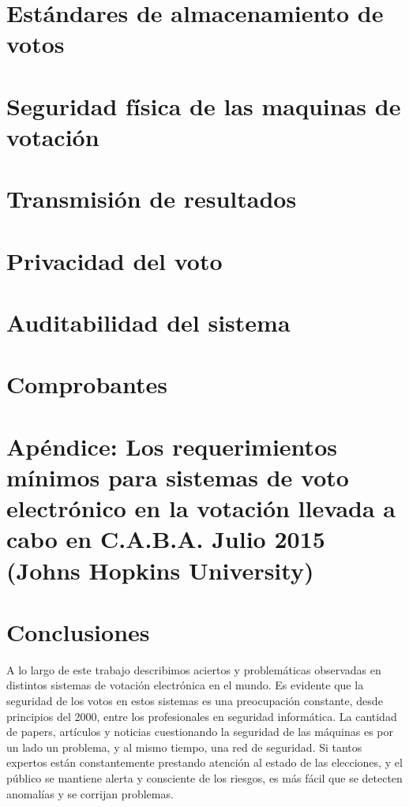 \documentclass[11pt]{article}
\begin{document}
\pagebreak
\section{Estándares de almacenamiento de votos}


\pagebreak
\section{Seguridad física de las maquinas de votación}


\pagebreak
\section{Transmisión de resultados}


\pagebreak
\section{Privacidad del voto}



\pagebreak
\section{Auditabilidad del sistema}


\pagebreak
\section{Comprobantes}


\pagebreak
\section{Apéndice: Los requerimientos mínimos para sistemas de voto electrónico en la votación llevada a cabo en C.A.B.A. Julio 2015 (Johns Hopkins University)}


\pagebreak
\section{Conclusiones}
A lo largo de este trabajo describimos aciertos y problemáticas observadas en distintos sistemas de votación electrónica en el mundo. Es evidente que la seguridad de los votos en estos sistemas es una preocupación constante, desde principios del 2000, entre los profesionales en seguridad informática. La cantidad de papers, artículos y noticias cuestionando la seguridad de las máquinas es por un lado un problema, y al mismo tiempo, una red de seguridad. Si tantos expertos están constantemente prestando atención al estado de las elecciones, y el público se mantiene alerta y consciente de los riesgos, es más fácil que se detecten anomalías y se corrijan problemas.
\end{document}

